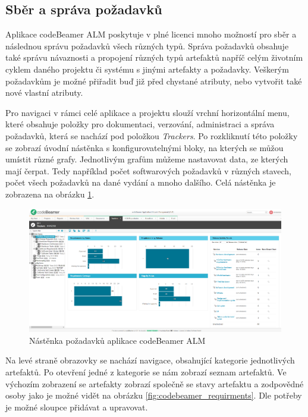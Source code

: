 \documentclass[czech,master]{diploma}
\begin{document}
\subsection{Sběr a správa požadavků}
Aplikace codeBeamer ALM poskytuje v plné licenci mnoho možností pro sběr a následnou správu požadavků všech různých typů. Správa požadavků obsahuje také správu návaznosti a propojení různých typů artefaktů napříč celým životním cyklem daného projektu či systému s jinými artefakty a požadavky. Veškerým požadavkům je možné přiřadit buď již před chystané atributy, nebo vytvořit také nové vlastní atributy.

Pro navigaci v rámci celé aplikace a projektu slouží vrchní horizontální menu, které obsahuje položky pro dokumentaci, verzování, administraci a správa požadavků, která se nachází pod položkou \textit{Trackers}. Po rozkliknutí této položky se zobrazí úvodní nástěnka s konfigurovatelnými bloky, na kterých se můžou umístit různé grafy. Jednotlivým grafům můžeme nastavovat data, ze kterých mají čerpat. Tedy například počet softwarových požadavků v různých stavech, počet všech požadavků na dané vydání a mnoho dalšího. Celá nástěnka je zobrazena na obrázku \ref{fig:codebeamer_trackers}.

\begin{figure}[!ht]
    \centering
    \includegraphics[width=1\textwidth]{Diplomka/Figures/codebeamer_trackers.png}
    \caption{Nástěnka požadavků aplikace codeBeamer ALM}
    \label{fig:codebeamer_trackers}
\end{figure}

Na levé straně obrazovky se nachází navigace, obsahující kategorie jednotlivých artefaktů. Po otevření jedné z kategorie se nám zobrazí seznam artefaktů. Ve výchozím zobrazení se artefakty zobrazí společně se stavy artefaktu a zodpovědné osoby jako je možné vidět na obrázku \ref{fig:codebeamer_requirments}. Dle potřeby je možné sloupce přidávat a upravovat.
\end{document}
